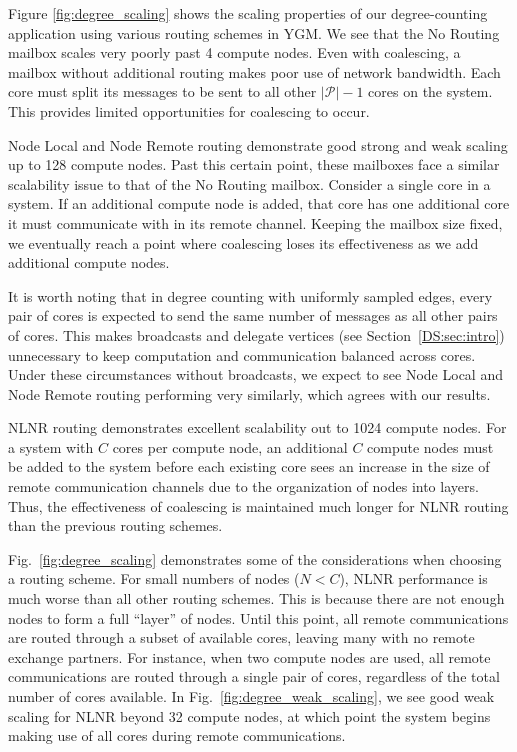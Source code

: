 \documentclass[10]{report}
\begin{document}
Figure \ref{fig:degree_scaling} shows the scaling properties of our degree-counting application using various routing
schemes in YGM.
We see that the No Routing mailbox scales very poorly past 4 compute nodes.
Even with coalescing, a mailbox without additional routing makes poor use of network bandwidth. 
Each core must split its messages to be sent to all other $|\mathcal{P}|-1$ cores on the system. 
This provides limited opportunities for coalescing to occur.

Node Local and Node Remote routing demonstrate good strong and weak scaling up to 128 compute nodes. 
Past this certain point, these mailboxes face a similar scalability issue to that of the No Routing mailbox. 
Consider a single core in a system. 
If an additional compute node is added, that core has one additional core it must communicate with in its remote channel. 
Keeping the mailbox size fixed, we eventually reach a point where coalescing loses its effectiveness as we add additional compute nodes. 

It is worth noting that in degree counting with uniformly sampled edges, every pair of cores is expected to send the same number of messages as all other pairs of cores. 
This makes broadcasts and delegate vertices (see Section~\ref{DS:sec:intro}) unnecessary to keep computation and communication balanced across cores. 
Under these circumstances without broadcasts, we expect to see Node Local and Node Remote routing performing very similarly, which agrees with our results.

NLNR routing demonstrates excellent scalability out to 1024 compute nodes. 
For a system with $C$ cores per compute node, an additional $C$ compute nodes must be added to the system before each existing core sees an increase in the size of remote communication channels due to the organization of nodes into layers. 
Thus, the effectiveness of coalescing is maintained much longer for NLNR routing than the previous routing schemes.

Fig.~\ref{fig:degree_scaling} demonstrates some of the considerations when choosing a routing scheme. 
For small numbers of nodes ($N < C$), NLNR performance is much worse than all other routing schemes.
This is because there are not enough nodes to form a full ``layer'' of nodes.
Until this point, all remote communications are routed through a subset of available cores, leaving many with no remote exchange partners. 
For instance, when two compute nodes are used, all remote communications are routed through a single pair of cores, regardless of the total number of cores available. 
In Fig.~\ref{fig:degree_weak_scaling}, we see good weak scaling for NLNR beyond 32 compute nodes, at which point the system begins
making use of all cores during remote communications.
\end{document}
